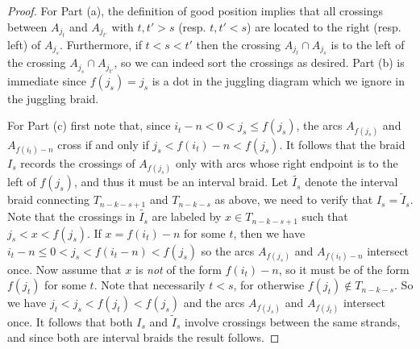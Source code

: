 \documentclass[10pt]{amsart}
\theoremstyle{plain}
\theoremstyle{definition}
\theoremstyle{remark}
\numberwithin{equation}{section}
\newcommand{\MG}[1]{{\color{teal}{{\bf Misha}: #1}}}
\begin{document}
\begin{proof}%
For Part (a), the definition of good position implies that all crossings between $A_{j_t}$ and $A_{j_{t'}}$ with $t,t'>s$ (resp. $t,t'<s$) are located to the right (resp. left) of $A_{j_s}$. Furthermore, if $t<s<t'$ then the crossing $A_{j_t}\cap A_{j_s}$ is to the left of the crossing $A_{j_s}\cap A_{j_{t'}}$, so we can indeed sort the crossings as desired. Part (b) is immediate since $f(j_s)=j_s$ is a dot in the juggling diagram which we ignore in the juggling braid.

For Part (c) first note that, since $i_t - n < 0 < j_s \leq f(j_s)$, the arcs $A_{f(j_s)}$ and $A_{f(i_t) - n}$ cross if and only if $j_s < f(i_t) - n < f(j_s)$. It follows that the braid $I_s$ records the crossings of $A_{f(j_s)}$ only with arcs whose right endpoint is to the left of $f(j_s)$, and thus it must be an interval braid. 
Let $\widetilde{I_s}$ denote the interval braid connecting 
$T_{n-k-s+1}$ and $T_{n-k-s}$ as above, we need to verify that $I_s = \widetilde{I}_s$. Note that the crossings in $\widetilde{I_s}$ are labeled by $x\in  T_{n-k-s+1}$ such that $j_s<x<f(j_s)$. If $x = f(i_t) - n$ for some $t$, then we have $i_t - n \leq 0 < j_s < f(i_t - n) < f(j_s)$ so the arcs $A_{f(j_s)}$ and $A_{f(i_t) -n}$ intersect once. Now assume that $x$ is \emph{not} of the form $f(i_t) - n$, so it must be of the form $f(j_t)$ for some $t$. Note that necessarily $t < s$, for otherwise $f(j_t) \not\in T_{n-k-s}$. So we have $j_t < j_s < f(j_t) < f(j_s)$ and the arcs $A_{f(j_s)}$ and $A_{f(j_t)}$ intersect once. It follows that both $I_s$ and $\widetilde{I}_s$ involve crossings between the same strands, and since both are interval braids the result follows.
\end{proof}
\end{document}
